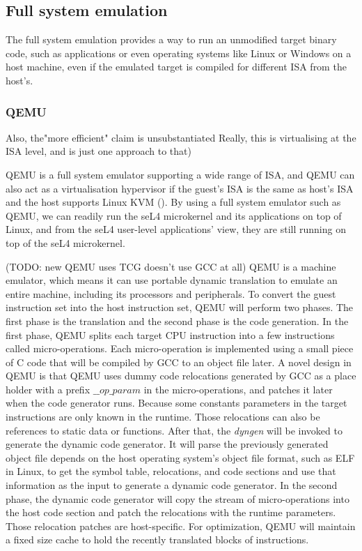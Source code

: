 \subsection{Full system emulation}

The full system emulation provides a way to run an unmodified target binary code, such as applications or even operating systems like Linux or Windows on a host machine, even if the emulated target is compiled for different ISA from the host's.

\subsubsection{QEMU}

Also, the"more efficient" claim is unsubstantiated
Really, this is virtualising at the ISA level, and is just one approach to that)

QEMU is a full system emulator supporting a wide range of ISA, and QEMU can also act as a virtualisation hypervisor if the guest's ISA is the same as host's ISA and the host supports Linux KVM (\cite{enwikiqemu}). By using a full system emulator such as QEMU, we can readily run the seL4 microkernel and its applications on top of Linux, and from the seL4 user-level applications' view, they are still running on top of the seL4 microkernel. 

(TODO: new QEMU uses TCG doesn't use GCC at all)
QEMU is a machine emulator, which means it can use portable dynamic translation to emulate an entire machine, including its processors and peripherals. To convert the guest instruction set into the host instruction set, QEMU will perform two phases. The first phase is the translation and the second phase is the code generation. In the first phase, QEMU splits each target CPU instruction into a few instructions called micro-operations. Each micro-operation is implemented using a small piece of C code that will be compiled by GCC to an object file later. A novel design in QEMU is that QEMU uses dummy code relocations generated by GCC as a place holder with a prefix \emph{$\_\_op\_param$} in the micro-operations, and patches it later when the code generator runs. Because some constants parameters in the target instructions are only known in the runtime. Those relocations can also be references to static data or functions. After that, the \emph{dyngen} will be invoked to generate the dynamic code generator. It will parse the previously generated object file depends on the host operating system's object file format, such as ELF in Linux, to get the symbol table, relocations, and code sections and use that information as the input to generate a dynamic code generator. In the second phase, the dynamic code generator will copy the stream of micro-operations into the host code section and patch the relocations with the runtime parameters. Those relocation patches are host-specific. For optimization, QEMU will maintain a fixed size cache to hold the recently translated blocks of instructions. 

